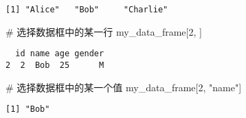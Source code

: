 \documentclass[
  letterpaper,
  DIV=11,
  numbers=noendperiod]{scrreprt}
\newenvironment{Shaded}{\begin{snugshade}}{\end{snugshade}}
\newcommand{\AttributeTok}[1]{\textcolor[rgb]{0.40,0.45,0.13}{#1}}
\newcommand{\CommentTok}[1]{\textcolor[rgb]{0.37,0.37,0.37}{#1}}
\newcommand{\DecValTok}[1]{\textcolor[rgb]{0.68,0.00,0.00}{#1}}
\newcommand{\FunctionTok}[1]{\textcolor[rgb]{0.28,0.35,0.67}{#1}}
\newcommand{\NormalTok}[1]{\textcolor[rgb]{0.00,0.23,0.31}{#1}}
\newcommand{\OtherTok}[1]{\textcolor[rgb]{0.00,0.23,0.31}{#1}}
\newcommand{\SpecialCharTok}[1]{\textcolor[rgb]{0.37,0.37,0.37}{#1}}
\newcommand{\StringTok}[1]{\textcolor[rgb]{0.13,0.47,0.30}{#1}}
\begin{document}
\begin{Shaded}
\end{Shaded}

\begin{verbatim}
[1] "Alice"   "Bob"     "Charlie"
\end{verbatim}

\begin{Shaded}
\begin{Highlighting}[]
\CommentTok{\# 选择数据框中的某一行}
\NormalTok{my\_data\_frame[}\DecValTok{2}\NormalTok{, ]}
\end{Highlighting}
\end{Shaded}

\begin{verbatim}
  id name age gender
2  2  Bob  25      M
\end{verbatim}

\begin{Shaded}
\begin{Highlighting}[]
\CommentTok{\# 选择数据框中的某一个值}
\NormalTok{my\_data\_frame[}\DecValTok{2}\NormalTok{, }\StringTok{"name"}\NormalTok{]}
\end{Highlighting}
\end{Shaded}

\begin{verbatim}
[1] "Bob"
\end{verbatim}

\begin{Shaded}
\end{Shaded}
\end{document}
